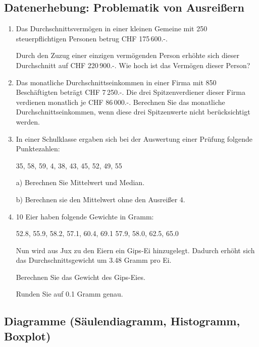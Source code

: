 \subsection{Datenerhebung: Problematik von Ausreißern}

\begin{enumerate}
\item Das Durchschnittsvermögen in einer kleinen Gemeine mit 250
  steuerpflichtigen Personen betrug CHF 175\,600.-.

  Durch den Zuzug einer einzigen vermögenden Person erhöhte sich
  dieser Durchschnitt auf CHF 220\,900.-. Wie hoch ist das Vermögen
  dieser Person?

\item Das monatliche Durchschnittseinkommen in einer Firma mit 850
  Beschäftigten beträgt CHF 7\,250.-. Die drei Spitzenverdiener dieser
  Firma verdienen monatlich je CHF 86\,000.-.
  Berechnen Sie das monatliche Durchschnittseinkommen, wenn diese drei
  Spitzenwerte nicht berücksichtigt werden.

\item
  In einer Schulklasse ergaben sich bei der Auswertung einer Prüfung
  folgende Punktezahlen:

  35, 58, 59, 4, 38, 43, 45, 52, 49, 55

  a) Berechnen Sie Mittelwert und Median.

  b) Berechnen sie den Mittelwert ohne den Ausreißer 4.

\item
  10 Eier haben folgende Gewichte in Gramm:

  52.8, 55.9, 58.2, 57.1, 60.4, 69.1 57.9, 58.0, 62.5, 65.0

  Nun wird aus Jux zu den Eiern ein Gips-Ei hinzugelegt. Dadurch
  erhöht sich das Durchschnittsgewicht um 3.48 Gramm pro Ei.

  Berechnen Sie das Gewicht des Gips-Eies.

  Runden Sie auf 0.1 Gramm genau.
  
\end{enumerate}


\subsection{Diagramme (Säulendiagramm, Histogramm, Boxplot)}


